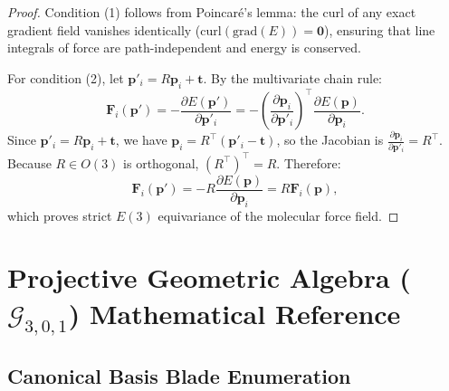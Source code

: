 \documentclass[10pt]{article}
\begin{document}
\begin{proof}
Condition (1) follows from Poincaré's lemma: the curl of any exact gradient field vanishes identically ($\mathrm{curl}(\mathrm{grad}(E)) = \mathbf{0}$), ensuring that line integrals of force are path-independent and energy is conserved.

For condition (2), let $\mathbf{p}'_i = R \mathbf{p}_i + \mathbf{t}$. By the multivariate chain rule:
\begin{equation}
    \mathbf{F}_i(\mathbf{p}') = -\frac{\partial E(\mathbf{p}')}{\partial \mathbf{p}'_i} = -\left( \frac{\partial \mathbf{p}_i}{\partial \mathbf{p}'_i} \right)^\top \frac{\partial E(\mathbf{p})}{\partial \mathbf{p}_i}.
\end{equation}
Since $\mathbf{p}'_i = R\mathbf{p}_i + \mathbf{t}$, we have $\mathbf{p}_i = R^\top(\mathbf{p}'_i - \mathbf{t})$, so the Jacobian is $\frac{\partial \mathbf{p}_i}{\partial \mathbf{p}'_i} = R^\top$. Because $R \in O(3)$ is orthogonal, $(R^\top)^\top = R$. Therefore:
\begin{equation}
    \mathbf{F}_i(\mathbf{p}') = -R \frac{\partial E(\mathbf{p})}{\partial \mathbf{p}_i} = R \mathbf{F}_i(\mathbf{p}),
\end{equation}
which proves strict $E(3)$ equivariance of the molecular force field.
\end{proof}


\section{Projective Geometric Algebra (\texorpdfstring{$\mathcal{G}_{3,0,1}$}{G(3,0,1)}) Mathematical Reference}
\label{app:pga_reference}

\subsection{Canonical Basis Blade Enumeration}
\end{document}
